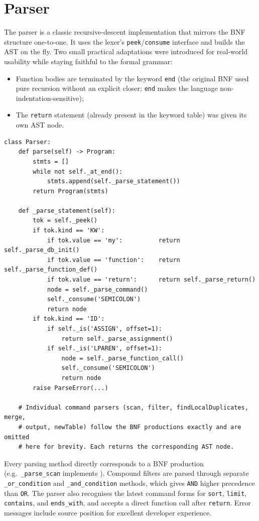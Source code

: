 \section{Parser}

The parser is a classic recursive-descent implementation that mirrors the BNF structure one-to-one. It uses the lexer’s \texttt{peek}/\texttt{consume} interface and builds the AST on the fly. Two small practical adaptations were introduced for real-world usability while staying faithful to the formal grammar:

\begin{itemize}[label=-, noitemsep]
    \item Function bodies are terminated by the keyword \texttt{end} (the original BNF used pure recursion without an explicit closer; \texttt{end} makes the language non-indentation-sensitive);
    \item The \texttt{return} statement (already present in the keyword table) was given its own AST node.
\end{itemize}

\begin{lstlisting}[style=dsl, caption={Parser entry point and statement dispatcher (excerpt)}, label={lst:parser}]
class Parser:
    def parse(self) -> Program:
        stmts = []
        while not self._at_end():
            stmts.append(self._parse_statement())
        return Program(stmts)

    def _parse_statement(self):
        tok = self._peek()
        if tok.kind == 'KW':
            if tok.value == 'my':          return self._parse_db_init()
            if tok.value == 'function':    return self._parse_function_def()
            if tok.value == 'return':      return self._parse_return()
            node = self._parse_command()
            self._consume('SEMICOLON')
            return node
        if tok.kind == 'ID':
            if self._is('ASSIGN', offset=1):
                return self._parse_assignment()
            if self._is('LPAREN', offset=1):
                node = self._parse_function_call()
                self._consume('SEMICOLON')
                return node
        raise ParseError(...)

    # Individual command parsers (scan, filter, findLocalDuplicates, merge,
    # output, newTable) follow the BNF productions exactly and are omitted
    # here for brevity. Each returns the corresponding AST node.
\end{lstlisting}

Every parsing method directly corresponds to a BNF production (e.g.\ \texttt{\_parse\_scan} implements ). Compound filters are parsed through separate \texttt{\_or\_condition} and \texttt{\_and\_condition} methods, which gives \texttt{AND} higher precedence than \texttt{OR}. The parser also recognises the latest command forms for \texttt{sort}, \texttt{limit}, \texttt{contains}, and \texttt{ends\_with}, and accepts a direct function call after \texttt{return}. Error messages include source position for excellent developer experience.

